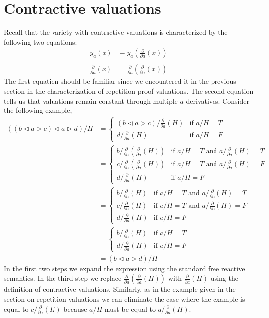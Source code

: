 \documentclass[a4paper,twoside,openright]{report}
\newcommand{\dd}[1]{\frac{\partial}{\partial #1}}
\newcommand{\lef}{\ensuremath{\triangleleft}}
\newcommand{\rig}{\ensuremath{\triangleright}}
\begin{document}
\section{Contractive valuations}
Recall that the variety with contractive valuations is characterized by the following two equations:
\begin{align*}
y_a(x) &= y_a(\dd a(x))\\\\
\dd a(x) &= \dd a(\dd a(x))
\end{align*}
The first equation should be familiar since we encountered it in the previous section in the characterization of repetition-proof valuations. The second equation tells us that valuations remain constant through multiple $a$-derivatives. Consider the following example,
\begin{align*}
((b\lef a\rig c)\lef a\rig d)/H
&=\begin{cases}
(b\lef a\rig c)/\dd a(H) & \text{if $a/H=T$}\\
d/\dd a(H) & \text{if $a/H=F$}
\end{cases}\\
&=\begin{cases}
b/\dd a(\dd a(H)) & \text{if $a/H=T$ and $a/\dd a(H)=T$}\\
c/\dd a(\dd a(H)) & \text{if $a/H=T$ and $a/\dd a(H)=F$}\\
d/\dd a(H) & \text{if $a/H=F$}
\end{cases}\\
&=\begin{cases}
b/\dd a(H) & \text{if $a/H=T$ and $a/\dd a(H)=T$}\\
c/\dd a(H) & \text{if $a/H=T$ and $a/\dd a(H)=F$}\\
d/\dd a(H) & \text{if $a/H=F$}
\end{cases}\\
&=\begin{cases}
b/\dd a(H) & \text{if $a/H=T$}\\
d/\dd a(H) & \text{if $a/H=F$}
\end{cases}\\
&=(b\lef a\rig d)/H
\end{align*}
In the first two steps we expand the expression using the standard free reactive semantics. In the third step we replace $\dd a(\dd a(H))$ with $\dd a(H)$ using the definition of contractive valuations. Similarly, as in the example given in the section on repetition valuations we can eliminate the case where the example is equal to $c/\dd a(H)$ because $a/H$ must be equal to $a/\dd a(H)$.
\end{document}
